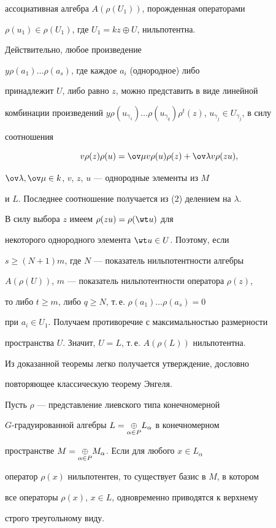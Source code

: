 \begin{pf}
ассоциативная алгебра $A(\rho(U_1))$, порожденная операторами 


$\rho(u_1)\in\rho(U_1)$, где $U_1=k z\oplus U$, нильпотентна. 


Действительно, любое произведение 


$y\rho(a_1)\dotsc\rho(a_s)$, где каждое $a_i$ (однородное) либо 


принадлежит $U$, либо равно $z$, можно представить в виде линейной 


комбинации произведений $y\rho(u_{\gamma_1})\dotsc 


\rho(u_{\gamma_q})\rho^t(z)$, $u_{\gamma_j}\in U_{\gamma_j}$, в силу 


соотношения 


$$ 


v\rho(z)\rho(u)=\ov\mu v\rho(u)\rho(z)+\ov\lambda v\rho(z u), 


$$ 


$\ov\lambda,\ov\mu\in k$, $v$, $z$, $u$ --- однородные элементы из $M$ 


и $L$. Последнее соотношение получается из (2) делением на $\lambda$. 


 


В силу выбора $z$ имеем $\rho(z u)=\rho(\wt u)$ для 


некоторого однородного элемента $\wt u\in U$. Поэтому, если 


$s\ge(N+1)m$, где $N$ --- показатель нильпотентности алгебры 


$A(\rho(U))$, $m$ --- показатель нильпотентности оператора $\rho(z)$, 


то либо $t\ge m$, либо $q\ge N$, т.\,е. $\rho(a_1)\dotsc \rho(a_s)=0$ 


при $a_i\in U_1$. Получаем противоречие с максимальностью размерности 


пространства $U$. Значит, $U=L$, т.\,е. $A(\rho(L))$ нильпотентна. 


\end{pf} 


 


Из доказанной теоремы легко получается утверждение, дословно 


повторяющее классическую теорему Энгеля. 


 


\begin{thm} 


Пусть $\rho$ --- представление лиевского типа конечномерной 


$G$-градуированной алгебры $L=\underset{\alpha\in P}{\oplus}{} L_\alpha$ в конечномерном 


пространстве $M=\underset{\alpha\in P}{\oplus}{} M_\alpha$. Если для любого $x\in L_\alpha$ 


оператор $\rho(x)$ нильпотентен, то существует базис в $M$, в котором 


все операторы $\rho(x)$, $x\in L$, одновременно приводятся к верхнему 


строго треугольному виду. 


\end{thm} 



